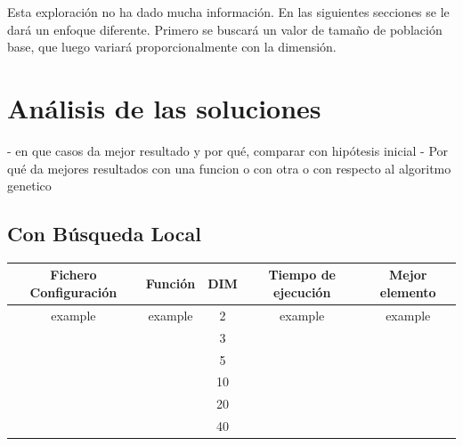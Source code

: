 Esta exploración no ha dado mucha información. En las siguientes secciones se le dará un enfoque diferente. Primero se buscará un valor de
tamaño de población base, que luego variará proporcionalmente con la dimensión.


\section{Análisis de las soluciones}

- en que casos da mejor resultado y por qué, comparar con hipótesis inicial
- Por qué da mejores resultados con una funcion o con otra o con respecto al algoritmo genetico


\subsection{Con Búsqueda Local}

\begin{tabular}{||c|c|c|c|c||}
    \hline
    \textbf{Fichero Configuración} & \textbf{Función} & \textbf{DIM} & \textbf{Tiempo de ejecución} & \textbf{Mejor elemento} \\ \hline
    example                                     & example          & 2      & example                      & example                 \\ \hline
                                                &                  & 3             &                              &                         \\ \hline
                                                &                  & 5             &                              &                         \\ \hline
                                                &                  & 10             &                              &                         \\ \hline
                                                &                  & 20             &                              &                         \\ \hline
                                                &                  & 40             &                              &                         \\ \hline

\end{tabular}

